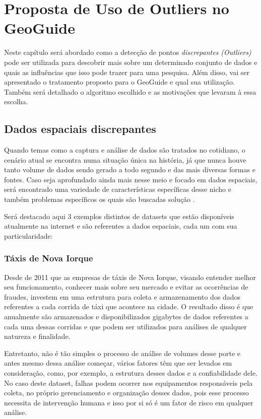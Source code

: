 \chapter{Proposta de Uso de Outliers no GeoGuide}
\label{chap:outliers}

Neste capítulo será abordado como a detecção de pontos \textit{discrepantes (Outliers)} pode ser utilizada para descobrir mais sobre um determinado conjunto de dados e quais as influências que isso pode trazer para uma pesquisa. Além disso, vai ser apresentado o tratamento proposto para o GeoGuide e qual sua utilização. Também será detalhado o algoritmo escolhido e as motivações que levaram à essa escolha.

\section{Dados espaciais discrepantes}

Quando temas como a captura e análise de dados são tratados no cotidiano, o cenário atual se encontra numa situação única na história, já que nunca houve tanto volume de dados sendo gerado a todo segundo e das mais diversas formas e fontes. Caso seja aprofundado ainda mais nesse meio e focado em dados espaciais, será encontrado uma variedade de características específicas desse nicho e também problemas específicos os quais são buscadas solução \cite{1755-1315-46-1-012058}.

Será destacado aqui 3 exemplos distintos de datasets que estão disponíveis atualmente na internet e são referentes a dados espaciais, cada um com sua particularidade:

\subsection{Táxis de Nova Iorque}

Desde de 2011 que as empresas de táxis de Nova Iorque, visando entender melhor seu funcionamento, conhecer mais sobre seu mercado e evitar as ocorrências de fraudes, investem em uma estrutura para coleta e armazenamento dos dados referentes a cada corrida de táxi que acontece na cidade. O resultado disso é que anualmente são armazenados e disponibilizados gigabytes de dados referentes a cada uma dessas corridas e que podem ser utilizados para análises de qualquer natureza e finalidade.

Entretanto, não é tão simples o processo de análise de volumes desse porte e antes mesmo dessa análise começar, vários fatores têm que ser levados em consideração, como, por exemplo, a estrutura desses dados e a confiabilidade dele. No caso deste dataset, falhas podem ocorrer nos equipamentos responsáveis pela coleta, no próprio gerenciamento e organização desses dados, pois esse processo necessita de intervenção humana e isso por si só é um fator de risco em qualquer análise.

